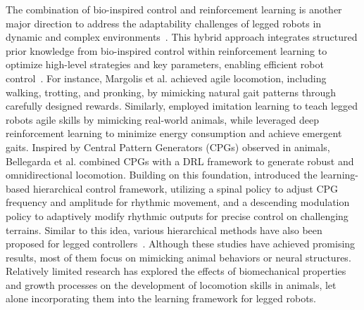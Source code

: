 The combination of bio-inspired control and reinforcement learning is another major direction to address the adaptability challenges of legged robots in dynamic and complex environments~\cite{abdi2019reinforcement, ouyang2021adaptive}.
This hybrid approach integrates structured prior knowledge from bio-inspired control within reinforcement learning to optimize high-level strategies and key parameters, enabling efficient robot control~\cite{humphreys2024learning, wang2021cpg, wei2018bio, zhang2023synloco}. For instance, Margolis et al.\cite{margolis2023walk} achieved agile locomotion, including walking, trotting, and pronking, by mimicking natural gait patterns through carefully designed rewards.
Similarly, \citet{peng2020learning} employed imitation learning to teach legged robots agile skills by mimicking real-world animals, while \citet{fu2021minimizing} leveraged deep reinforcement learning to minimize energy consumption and achieve emergent gaits.
Inspired by Central Pattern Generators (CPGs) observed in animals, Bellegarda et al.\cite{bellegarda2022cpg} combined CPGs with a DRL framework to generate robust and omnidirectional locomotion.
Building on this foundation, \citet{sun2024learning} introduced the learning-based hierarchical control framework, utilizing a spinal policy to adjust CPG frequency and amplitude for rhythmic movement, and a descending modulation policy to adaptively modify rhythmic outputs for precise control on challenging terrains.
Similar to this idea, various hierarchical methods have also been proposed for legged controllers~\cite{he2024learning, jain2019hierarchical, jain2020pixels}. 
Although these studies have achieved promising results, most of them focus on mimicking animal behaviors or neural structures. Relatively limited research has explored the effects of biomechanical properties and growth processes on the development of locomotion skills in animals, let alone incorporating them into the learning framework for legged robots.
